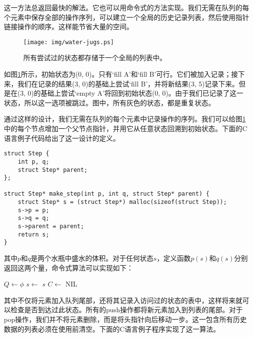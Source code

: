 \documentclass[UTF8]{article}
\begin{document}
这一方法总返回最快的解法。它也可以用命令式的方法实现。我们无需在队列的每个元素中保存全部的操作序列，可以建立一个全局的历史记录列表，然后使用指针链接操作的顺序。这样能节省大量的空间。

\begin{figure}[htbp]
  \centering
  \texttt{[image: img/water-jugs.ps]}
  \caption{所有尝试过的状态都存储于一个全局的列表中。}
  \label{fig:water-jugs}
\end{figure}

如图\ref{fig:water-jugs}所示，初始状态为(0, 0)。只有`fill A'和`fill B'可行。它们被加入记录；接下来，我们在记录的结果(3, 0)的基础上尝试`fill B'，并将新结果(3, 5)记录下来。但是在(3, 0)的基础上尝试`empty A'将回到初始状态(0, 0)。由于我们已记录了这一状态，所以这一选项被跳过。图中，所有灰色的状态，都是重复状态。

通过这样的设计，我们无需在队列的每个元素中记录操作的序列。我们可以给图\ref{fig:water-jugs}中的每个节点增加一个父节点指针，并用它从任意状态回溯到初始状态。下面的C语言例子代码给出了这一设计的定义。

\lstset{language=C}
\begin{lstlisting}
struct Step {
    int p, q;
    struct Step* parent;
};

struct Step* make_step(int p, int q, struct Step* parent) {
    struct Step* s = (struct Step*) malloc(sizeof(struct Step));
    s->p = p;
    s->q = q;
    s->parent = parent;
    return s;
}
\end{lstlisting}

其中$p$和$q$是两个水瓶中盛水的体积。对于任何状态$s$，定义函数$p(s)$和$q(s)$分别返回这两个量，命令式算法可以实现如下：

\begin{algorithmic}[1]
  \State $Q \gets \phi$
  \State {}
    \State $s \gets$ 
      \State \Return $s$
    \Else
      \State $C \gets$ 
          \State {}
        \EndIf
      \EndFor
    \EndIf
  \EndWhile
  \State \Return NIL
\EndFunction
\end{algorithmic}

其中不仅将元素加入队列尾部，还将其记录入访问过的状态的表中，这样将来就可以检查是否到达过此状态。所有的push操作都将新元素加入到列表的尾部。对于pop操作，我们并不将元素删除，而是将头指针向后移动一步。这一包含所有历史数据的列表必须在使用前清空。下面的C语言例子程序实现了这一算法。
\end{document}
